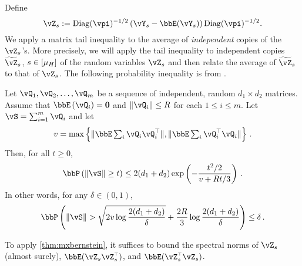 Define
\[
  \vZ_s
  := \Diag(\vpi)^{-1/2} \left( \vY_s 
  - \bbE(\vY_s) \right)\Diag(\vpi)^{-1/2}
  .
\]
We apply a matrix tail inequality to the average of \emph{independent}
copies of the $\vZ_s$'s.
More precisely, we will apply the tail inequality to independent
copies $\wt{\vZ}_s$, $s\in [\mu_H]$ of the random variables
$\vZ_s$ and then relate the average of $\wt{\vZ}_s$ to that of
$\vZ_s$.
The following probability inequality is from \citet[Theorem
6.1.1.]{tropp2015intro}.
\begin{theorem}
\label{thm:mxbernstein}
Let $\vQ_1,\vQ_2,\dotsc,\vQ_m$ be a sequence of independent, random
$d_1 \times d_2$ matrices.
Assume that $\EE{\vQ_i} = \v0$ and $\Norm{\vQ_i}\le R$ for each $1\le
i \le m$.
Let $\vS = \sum_{i=1}^m \vQ_i$ and let 
\begin{align*}
v = \max\left\{ \norm{\bbE \textstyle\sum_i \vQ_i \vQ_i^\top  }, 
						      \norm{\bbE \textstyle\sum_i \vQ_i^\top \vQ_i  }
			\right\}\,.
\end{align*}
Then, for all $t\ge 0$, 
\[
\bbP\left( \Norm{\vS} \ge t \right) \le 2(d_1 + d_2) \exp\left( -\frac{t^2/2}{v+R t/3}\right)\,.
\]
In other words, for any $\delta \in (0,1)$,
\[
  \bbP\Parens{
    \norm{\vS} > \sqrt{2 v \log \frac{2(d_1+d_2)}{\delta}} + \frac{2R}{3}
    \log\frac{2(d_1+d_2)}{\delta}
  } \leq \delta
  \,.
\]
\end{theorem}

To apply \cref{thm:mxbernstein}, it suffices to bound the spectral
norms of $\vZ_s$ (almost surely), $\bbE(\vZ_s \vZ_s^\t)$, and
$\bbE(\vZ_s^\t \vZ_s)$.

